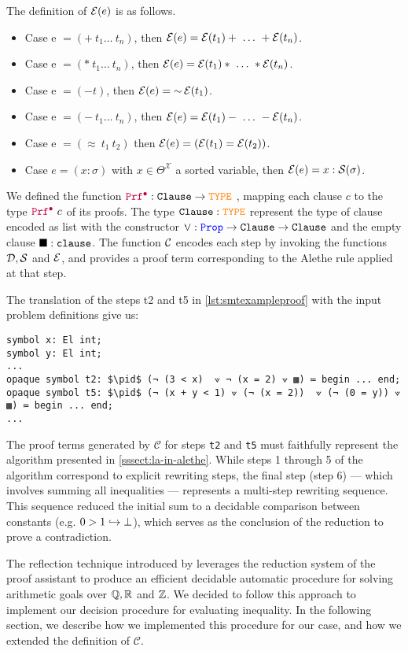 \begin{definition}
The definition of $\E{e}$ is as follows.
\begin{itemize}
\setlength{\parskip}{0pt}
\item Case e $= (+~t_1\dots~t_n)$, then $\E{e} = \E{t_1} + ~\dots~ +\E{t_n}$.
\item Case e $= (*~t_1\dots~t_n)$, then $\E{e} = \E{t_1} * ~\dots~ *\E{t_n}$.
\item Case e $= (-t)$, then $\E{e} = \mathop{\sim} \E{t_1}$.
\item Case e $= (-~t_1\dots~t_n)$, then $\E{e} = \E{t_1} - ~\dots~ - \E{t_n}$.
\item Case e $= (\approx~t_1~t_2)$ then $\E{e} = (\E{t_1} = \E{t_2})$.
\item Case $e = (x: \sigma )$ with $x \in \Theta^\mathcal{X}$ a sorted variable, then $\E{e} = x: \cal{S}(\sigma)$.
\end{itemize}
\end{definition}

We defined the function $\pid: \tt{Clause} \ra \type$ \cite[\S 3]{ColtellacciMD24}, mapping each clause $c$ to the type $\pid~c$ of its proofs.
The type $\tt{Clause}: \type$ represent the type of clause encoded as list with the constructor $\veedot: \prop \ra \tt{Clause} \ra \tt{Clause}$ and the empty clause $\nil: \tt{clause}$.
The function $\cal{C}$ encodes each step by invoking the functions $\cal{D},\cal{S}$ and $\cal{E}$, and provides a proof term corresponding to the Alethe rule applied at that step.

\begin{example}
The translation of the steps t2 and t5 in \cref{lst:smtexampleproof} with the input problem definitions give us:
\begin{lstlisting}[language=Lambdapi,mathescape=true]
symbol x: El int;
symbol y: El int;
...
opaque symbol t2: $\pid$ (¬ (3 < x)  ⟇ ¬ (x = 2) ⟇ ▩) ≔ begin ... end;
opaque symbol t5: $\pid$ (¬ (x + y < 1) ⟇ (¬ (x = 2))  ⟇ (¬ (0 = y)) ⟇ ▩) ≔ begin ... end;
...
\end{lstlisting}
\end{example}

The proof terms generated by $\mathcal{C}$ for steps \texttt{t2} and \texttt{t5} must faithfully represent the algorithm presented in \cref{sssect:la-in-alethe}.
While steps 1 through 5 of the algorithm correspond to explicit rewriting steps, the final step (step 6) — which involves summing all inequalities — represents a multi-step rewriting sequence.
This sequence reduced the initial sum to a decidable comparison between constants (e.g. $0 > 1 \re \bot$), which serves as the conclusion of the reduction to prove a contradiction.


The reflection technique introduced by \cite{reflection-origin-coq} leverages the reduction system of the proof assistant to produce an efficient decidable automatic
procedure for solving arithmetic goals over $\bb{Q}, \bb{R}$ and $\bb{Z}$. We decided to follow this approach to implement our decision procedure for evaluating inequality.
In the following section, we describe how we implemented this procedure for our case, and how we extended the definition of $\mathcal{C}$.